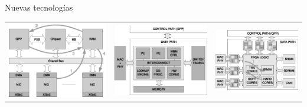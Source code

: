 \documentclass[xcolor=dvipsnames]{beamer}
\begin{document}
\begin{frame}{Nuevas tecnologías}
\begin{tabularx}{\linewidth}{VVV}
      \includegraphics[scale=0.35]{figures/GPP_based.eps}
      &
      \includegraphics[scale=0.35]{figures/NP_based.eps}
      &
      \includegraphics[scale=0.38]{figures/FPGA_based.eps}

\end{tabularx}
\end{frame}
\end{document}
